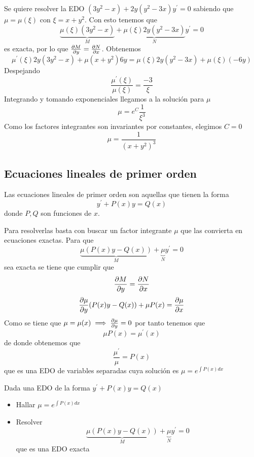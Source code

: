 \begin{example}
Se quiere resolver la EDO $(3y^2-x)+2y(y^2-3x)y^\prime = 0$ sabiendo que $\mu = \mu(\xi)$ con $\xi = x+y^2$. Con esto tenemos que $$\underbrace{\mu(\xi)(3y^2-x)}_M+\underbrace{\mu(\xi)2y(y^2-3x)}_Ny^\prime = 0$$ es exacta, por lo que $\partialder{y}{M} = \partialder{x}{N}$.
Obtenemos $$\mu^\prime(\xi)2y(3y^2-x)+\mu(x+y^2)6y = \mu(\xi)2y(y^2-3x)+\mu(\xi)(-6y)$$
Despejando $$\frac{\mu^\prime(\xi)}{\mu(\xi)} = \frac{-3}{\xi}$$
Integrando y tomando exponenciales llegamos a la solución para $\mu$ $$\mu = e^C\frac{1}{\xi^3}$$
Como los factores integrantes son invariantes por constantes, elegimos $C=0$ $$\mu = \frac{1}{(x+y^2)^3}$$
\end{example}

\subsection{Ecuaciones lineales de primer orden}
Las ecuaciones lineales de primer orden son aquellas que tienen la forma $$y^\prime +P(x)y=Q(x)$$ donde $P,Q$ son funciones de $x$.

Para resolverlas basta con buscar un factor integrante $\mu$ que las convierta en ecuaciones exactas.
Para que
$$\underbrace{\mu(P(x)y-Q(x))}_M+\underbrace{\mu}_N y^\prime = 0$$
sea exacta se tiene que cumplir que $$\partialder{y}{M} = \partialder{x}{N}$$
$$\partialder{y}{\mu}(P(x)y-Q(x)) + \mu P(x) = \partialder{x}{\mu}$$
Como se tiene que $\mu = \mu(x) \implies \partialder{y}{\mu} = 0$ por tanto tenemos que $$\mu P(x) = \mu^\prime(x)$$ de donde obtenemos que $$\frac{\mu^\prime}{\mu} = P(x)$$ que es una EDO de variables separadas cuya solución es $\mu = e^{\int P(x)dx}$

\begin{method}
Dada una EDO de la forma $y^\prime +P(x)y = Q(x)$
\begin{itemize}
\item Hallar $\mu = e^{\int P(x)dx}$
\item Resolver $$\underbrace{\mu(P(x)y-Q(x))}_M+\underbrace{\mu}_N y^\prime = 0$$ que es una EDO exacta
\end{itemize}
\end{method}

